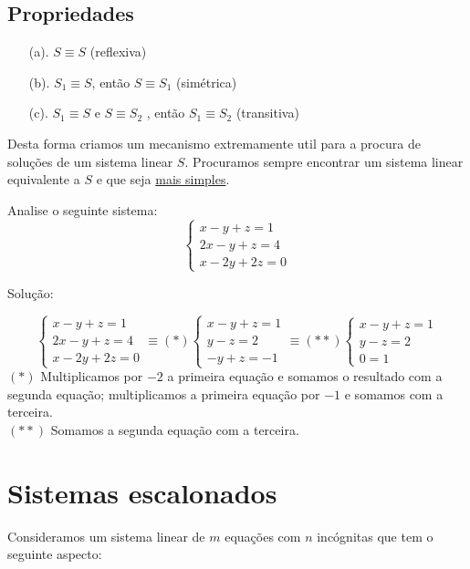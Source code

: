 \subsection*{Propriedades}
\begin{itemize}
	\item[(a).] $S\equiv S$ (reflexiva) 
	\item[(b).] $S_{1} \equiv S$, então $S \equiv S_{1}$ (simétrica)
	\item[(c).] $S_{1} \equiv S$ e $S \equiv S_{2}$ , então $S_{1} \equiv S_{2}$ (transitiva)
\end{itemize}
Desta forma criamos um mecanismo extremamente util para a procura de soluções de um sistema linear $S$. Procuramos sempre encontrar um sistema linear equivalente a $S$ e que seja \underline{mais simples}.
\begin{ex}
	Analise o seguinte sistema:\\
	\begin{equation*}
	\begin{cases}
	x-y+z=1 \\
	2x-y+z=4\\
	x-2y+2z=0
	\end{cases}
	\end{equation*} 
\end{ex}
Solução:

\begin{equation*}
\begin{cases}
x-y+z=1 \\
2x-y+z=4\\
x-2y+2z=0
\end{cases} \equiv (*) \begin{cases}
x-y+z=1 \\
y-z=2\\
-y+z=-1
\end{cases} \equiv (**) \begin{cases}
x-y+z=1 \\
y-z=2\\
0=1
\end{cases}
\end{equation*}
$(*)$ Multiplicamos por $-2$ a primeira equação e somamos o resultado com a segunda equação; multiplicamos a primeira equação por $-1$ e somamos com a terceira.\\
$(**)$ Somamos a segunda equação com a terceira. 

\newpage
\section{Sistemas escalonados}
Consideramos um sistema linear de $m$ equações com $n$ incógnitas que tem o seguinte aspecto:

